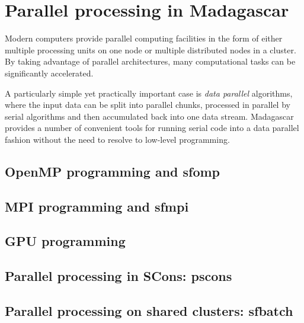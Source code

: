 \chapter{Parallel processing in Madagascar}

Modern computers provide parallel computing facilities in the form of
either multiple processing units on one node or multiple distributed
nodes in a cluster. By taking advantage of parallel architectures,
many computational tasks can be significantly accelerated.

A particularly simple yet practically important case is \emph{data
  parallel} algorithms, where the input data can be split into
parallel chunks, processed in parallel by serial algorithms and then
accumulated back into one data stream. Madagascar provides a number of
convenient tools for running serial code into a data parallel fashion
without the need to resolve to low-level programming.

\section{OpenMP programming and sfomp}

\section{MPI programming and sfmpi}

\section{GPU programming}

\section{Parallel processing in SCons: pscons}

\section{Parallel processing on shared clusters: sfbatch} 
